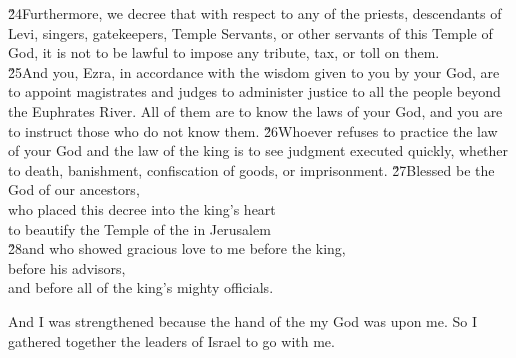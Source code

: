 \begin{poetry}
\poeml \v{24}Furthermore, we decree that with respect to any of the priests, descendants of Levi, singers, gatekeepers, Temple Servants, or other servants of this Temple of God, it is not to be lawful to impose any tribute, tax, or toll on them. \\
\poeml \v{25}And you, Ezra, in accordance with the wisdom given to you by your God, are to appoint magistrates and judges to administer justice to all the people beyond the Euphrates River. All of them are to know the laws of your God, and you are to instruct those who do not know them. \v{26}Whoever refuses to practice the law of your God and the law of the king is to see judgment executed quickly, whether to death, banishment, confiscation of goods, or imprisonment.
\poeml \v{27}Blessed be the  God of our ancestors, \\
\poemll    who placed this decree into the king's heart \\
\poemlll       to beautify the Temple of the  in Jerusalem \\
\poeml \v{28}and who showed gracious love to me before the king, \\
\poemlll       before his advisors, \\
\poemlll       and before all of the king's mighty officials.
\end{poetry}

And I was strengthened because the hand of the  my God was upon me. So I gathered together the leaders of Israel to go with me.

